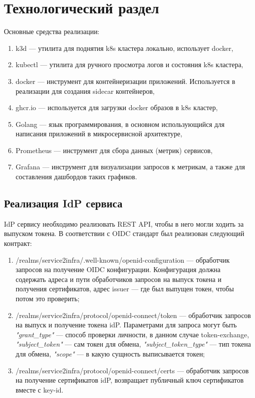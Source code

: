 \chapter{Технологический раздел}

Основные средства реализации:
\begin{enumerate}
\item k3d --- утилита для поднятия k8s кластера локально, использует docker, %
\item kubectl --- утилита для ручного просмотра логов и состояния k8s кластера,
\item docker --- инструмент для контейнеризации приложений. Используется в реализации для создания sidecar контейнеров,
\item ghcr.io --- используется для загрузки docker образов в k8s кластер,
\item Golang --- язык программирования, в основном использующийся для написания приложений в микросервисной архитектуре, %
\item Prometheus --- инструмент для сбора данных (метрик) сервисов,
\item Grafana --- инструмент для визуализации запросов к метрикам, а также для составления дашбордов таких графиков.
\end{enumerate}

\section{Реализация IdP сервиса}

IdP сервису необходимо реализовать REST API, чтобы в него могли ходить за выпуском токена.
В соответствии с OIDC стандарт был реализован следующий контракт:

\begin{enumerate}
\item /realms/service2infra/.well-known/openid-configuration --- обработчик запросов на получение OIDC конфигурации. Конфигурация должна содержать адреса и пути обработчиков запросов на выпуск токена и получения сертификатов, адрес issuer --- где был выпущен токен, чтобы потом это проверить;
\item /realms/service2infra/protocol/openid-connect/token --- обработчик запросов на выпуск и получение токена idP. Параметрами для запроса могут быть \textit{"grant\_type"} --- способ проверки личности, в данном случае token-exchange, \textit{"subject\_token"} --- сам токен для обмена, \textit{"subject\_token\_type"} --- тип токена для обмена, \textit{"scope"} --- в какую сущность выписывается токен;
\item /realms/service2infra/protocol/openid-connect/certs --- обработчик запросов на получение сертификатов idP, возвращает публичный ключ сертификатов вместе с key-id.
\end{enumerate}

